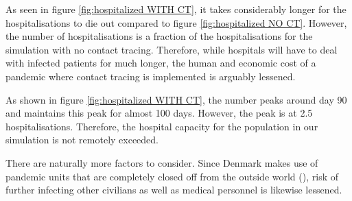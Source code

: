 As seen in figure \vref{fig:hospitalized WITH CT}, it takes considerably longer for the hospitalisations to die out compared to figure \vref{fig:hospitalized NO CT}. However, the number of hospitalisations is a fraction of the hospitalisations for the simulation with no contact tracing. Therefore, while hospitals will have to deal with infected patients for much longer, the human and economic cost of a pandemic where contact tracing is implemented is arguably lessened.

As shown in figure \vref{fig:hospitalized WITH CT}, the number peaks around day 90 and maintains this peak for almost 100 days. However, the peak is at 2.5 hospitalisations. Therefore, the hospital capacity for the population in our simulation is not remotely exceeded.

There are naturally more factors to consider. Since Denmark makes use of pandemic units that are completely closed off from the outside world (\cite{dansk_sygeplejerad_fra_2020}), risk of further infecting other civilians as well as medical personnel is likewise lessened.